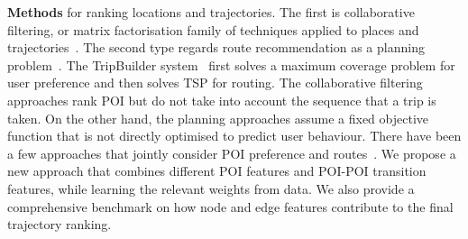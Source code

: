 {\bf Methods} for ranking locations and trajectories.
The first is collaborative filtering, or matrix factorisation family of techniques applied to places and trajectories~\cite{shi2011personalized,ijcai13,zhang2015location}. The second type regards route recommendation as a planning problem~\cite{gioniswsdm14,ijcai15}.
The TripBuilder system~\cite{brilhante2013shall} first solves a maximum coverage problem for user preference and then solves TSP for routing. The collaborative filtering approaches rank POI but do not take into account the sequence that a trip is taken. On the other hand, the planning approaches assume a fixed objective function that is not directly optimised to predict user behaviour. There have been a few approaches that jointly consider POI preference and routes~\cite{lu2012personalized, kurashima2010geotag,chen2015tripplanner}.
We propose a new approach that combines different POI features and POI-POI transition features, while learning the relevant weights from data. We also provide a comprehensive benchmark on how node and edge features contribute to the final trajectory ranking.




